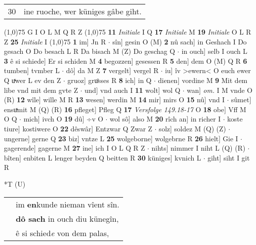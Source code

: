\documentclass[8pt,a4paper,notitlepage]{article}
\begin{document}
\begin{table}[ht]
\begin{minipage}[t]{0.5\linewidth}
\begin{tabular}{rl}
30 & ine ruoche, wer küniges gâbe giht.\\ 
\end{tabular}
\scriptsize
\line(1,0){75} \newline
G I O L M Q R Z \newline
\line(1,0){75} \newline
\textbf{11} \textit{Initiale} I Q  \textbf{17} \textit{Initiale} M  \textbf{19} \textit{Initiale} O L R Z  \textbf{25} \textit{Initiale} I  \newline
\line(1,0){75} \newline
\textbf{1} im] Jn R  $\cdot$ sîn] gesin O (M) \textbf{2} nû sach] in Geshach I Do gesach O Do besach L R Da bisach M (Z) Do geschag Q  $\cdot$ in ouch] selb I ouch L \textbf{3} ê si schiede] Er si schiden M \textbf{4} begozzen] gesessen R \textbf{5} den] dem O (M) Q R \textbf{6} tumben] tvmber L  $\cdot$ dô] da M Z \textbf{7} vergelt] vergel R  $\cdot$ iu] îv >ewern< O euch ewer Q uͯwer L ev den Z  $\cdot$ gruoz] gruͦsses R \textbf{8} ich] in Q  $\cdot$ dienen] vordine M \textbf{9} Mit dem libe vnd mit dem gvte Z  $\cdot$ und] vnd auch I \textbf{11} wolt] wol Q  $\cdot$ wan] \textit{om.} I M vnde O (R) \textbf{12} wîle] wille M R \textbf{13} wesen] werdin M \textbf{14} mir] mirs O \textbf{15} nû] vnd I  $\cdot$ sûmet] ensuͯmit M (Q) (R) \textbf{16} pfleget] Pfleg Q \textbf{17} \textit{Versfolge 149.18-17} O  \textbf{18} obe] Vff M O Q  $\cdot$ mich] ivch O \textbf{19} dû] ÷v O  $\cdot$ wol sô] also M \textbf{20} rîch an] in richer I  $\cdot$ koste tiure] kostiwere O \textbf{22} dêswâr] Entzwar Q Zwar Z  $\cdot$ solz] soldez M (Q) (Z)  $\cdot$ ungerne] gerne Q \textbf{23} biz] vntze L \textbf{25} wolgeborne] wolgebrne R \textbf{26} hielt] Gie I  $\cdot$ gagerende] gagerne M \textbf{27} ine] ich I O L Q R Z  $\cdot$ nihts] nimmer I niht L (Q) (R)  $\cdot$ bîten] enbiten L lenger beyden Q beitten R \textbf{30} küniges] kvnich L  $\cdot$ giht] siht I git R \newline
\end{minipage}
\hspace{0.5cm}
\begin{minipage}[t]{0.5\linewidth}
\small
\begin{center}*T (U)
\end{center}
\begin{tabular}{rl}
 & im \textbf{en}kunde nieman vîent sîn.\\ 
 & \textbf{dô sach} in ouch diu künegîn,\\ 
 & ê si schied\textit{e} von dem palas,\\ 

\end{tabular}
\end{minipage}
\end{table}
\end{document}
